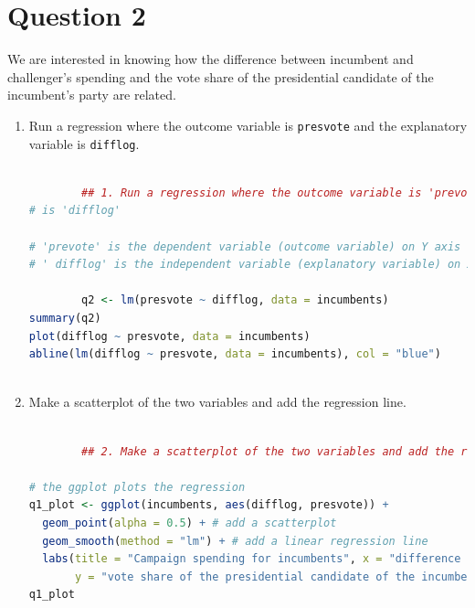 \documentclass[12pt,letterpaper]{article}
\begin{document}
\section*{Question 2}%
\noindent We are interested in knowing how the difference between incumbent and challenger's spending and the vote share of the presidential candidate of the incumbent's party are related.	\vspace{.25cm}
	\begin{enumerate}
		\item Run a regression where the outcome variable is \texttt{presvote} and the explanatory variable is \texttt{difflog}.	\vspace{5cm}
		
		\begin{lstlisting}[language=R]
		
		## 1. Run a regression where the outcome variable is 'prevote' and the explanatory variable
# is 'difflog' 

# 'prevote' is the dependent variable (outcome variable) on Y axis
# ' difflog' is the independent variable (explanatory variable) on X axis
		
		q2 <- lm(presvote ~ difflog, data = incumbents)
summary(q2)
plot(difflog ~ presvote, data = incumbents)
abline(lm(difflog ~ presvote, data = incumbents), col = "blue")
		
		\end{lstlisting}
		
		
		\item Make a scatterplot of the two variables and add the regression line. 	\vspace{5cm}
		
		\begin{lstlisting}[language=R]
		
		## 2. Make a scatterplot of the two variables and add the regression line

# the ggplot plots the regression
q1_plot <- ggplot(incumbents, aes(difflog, presvote)) +
  geom_point(alpha = 0.5) + # add a scatterplot
  geom_smooth(method = "lm") + # add a linear regression line
  labs(title = "Campaign spending for incumbents", x = "difference between incumbent and challenger's spending", 
       y = "vote share of the presidential candidate of the incumbent's party")
q1_plot
		
		\end{lstlisting}
		

\end{enumerate}
\end{document}
